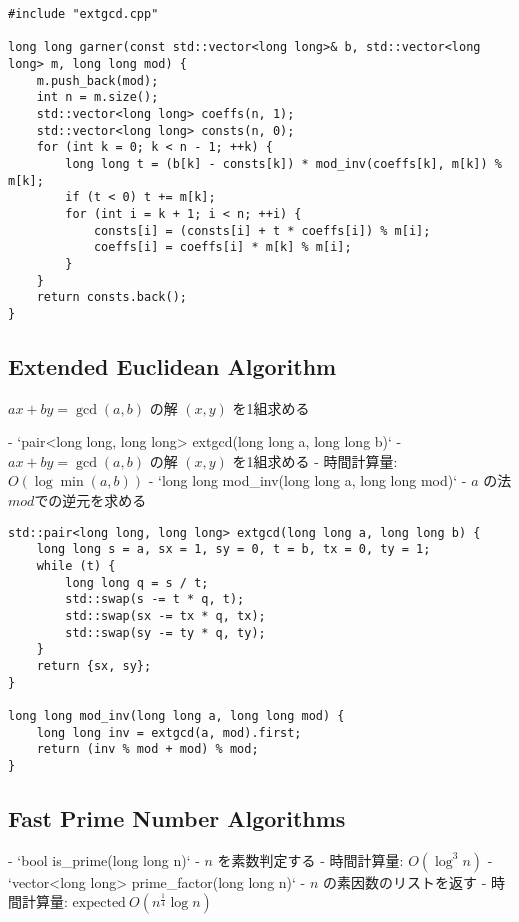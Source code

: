 \begin{lstlisting}
#include "extgcd.cpp"

long long garner(const std::vector<long long>& b, std::vector<long long> m, long long mod) {
    m.push_back(mod);
    int n = m.size();
    std::vector<long long> coeffs(n, 1);
    std::vector<long long> consts(n, 0);
    for (int k = 0; k < n - 1; ++k) {
        long long t = (b[k] - consts[k]) * mod_inv(coeffs[k], m[k]) % m[k];
        if (t < 0) t += m[k];
        for (int i = k + 1; i < n; ++i) {
            consts[i] = (consts[i] + t * coeffs[i]) % m[i];
            coeffs[i] = coeffs[i] * m[k] % m[i];
        }
    }
    return consts.back();
}
\end{lstlisting}

\subsection{Extended Euclidean Algorithm}

\begin{small}
\begin{markdown}
$ax + by = \gcd(a, b)$ の解 $(x, y)$ を1組求める

- `pair<long long, long long> extgcd(long long a, long long b)`
    - $ax + by = \gcd(a, b)$ の解 $(x, y)$ を1組求める
    - 時間計算量: $O(\log \min(a, b))$
- `long long mod\_inv(long long a, long long mod)`
    - $a$ の法$mod$での逆元を求める
\end{markdown}
\end{small}

\begin{lstlisting}
std::pair<long long, long long> extgcd(long long a, long long b) {
    long long s = a, sx = 1, sy = 0, t = b, tx = 0, ty = 1;
    while (t) {
        long long q = s / t;
        std::swap(s -= t * q, t);
        std::swap(sx -= tx * q, tx);
        std::swap(sy -= ty * q, ty);
    }
    return {sx, sy};
}

long long mod_inv(long long a, long long mod) {
    long long inv = extgcd(a, mod).first;
    return (inv % mod + mod) % mod;
}
\end{lstlisting}

\subsection{Fast Prime Number Algorithms}

\begin{small}
\begin{markdown}
- `bool is\_prime(long long n)`
    - $n$ を素数判定する
    - 時間計算量: $O(\log^3 n)$
- `vector<long long> prime\_factor(long long n)`
    - $n$ の素因数のリストを返す
    - 時間計算量: $\mathrm{expected}\ O(n^{\frac{1}{4}} \log n)$
\end{markdown}
\end{small}

